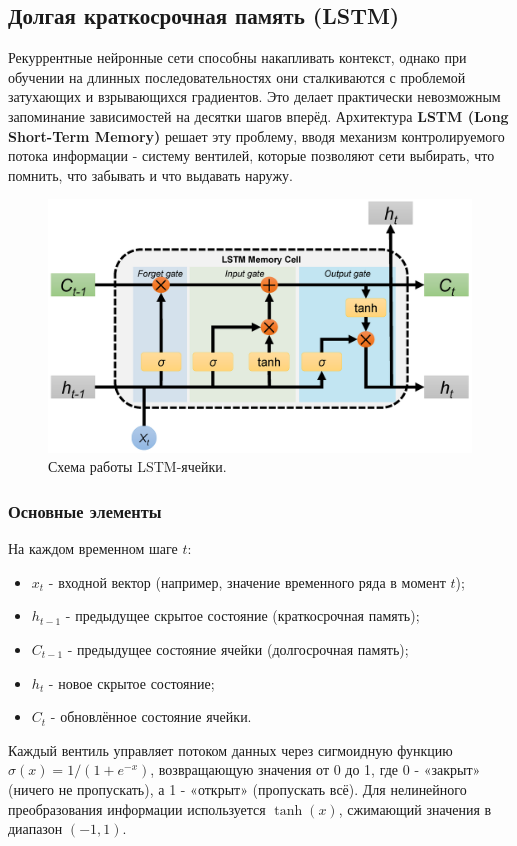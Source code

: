 \documentclass[12pt,a4paper]{article}
\begin{document}
\subsection{Долгая краткосрочная память (LSTM)}

Рекуррентные нейронные сети способны накапливать контекст, однако при обучении на длинных последовательностях они сталкиваются с проблемой затухающих и взрывающихся градиентов. Это делает практически невозможным запоминание зависимостей на десятки шагов вперёд.
Архитектура \textbf{LSTM (Long Short-Term Memory)} решает эту проблему, вводя механизм контролируемого потока информации - систему вентилей, которые позволяют сети выбирать, что помнить, что забывать и что выдавать наружу.

\begin{figure}[h]
  \centering
  \includegraphics[width=0.70\linewidth]{LSTM.png}
  \caption{Схема работы LSTM-ячейки.}
\end{figure}

\subsubsection*{Основные элементы}
На каждом временном шаге \(t\):
\begin{itemize}
  \item \(x_t\) - входной вектор (например, значение временного ряда в момент \(t\));
  \item \(h_{t-1}\) - предыдущее скрытое состояние (краткосрочная память);
  \item \(C_{t-1}\) - предыдущее состояние ячейки (долгосрочная память);
  \item \(h_t\) - новое скрытое состояние;
  \item \(C_t\) - обновлённое состояние ячейки.
\end{itemize}

Каждый вентиль управляет потоком данных через сигмоидную функцию \(\sigma(x)=1/(1+e^{-x})\), возвращающую значения от 0 до 1, где 0 - «закрыт» (ничего не пропускать), а 1 - «открыт» (пропускать всё).
Для нелинейного преобразования информации используется \(\tanh(x)\), сжимающий значения в диапазон \((-1, 1)\).
\end{document}
